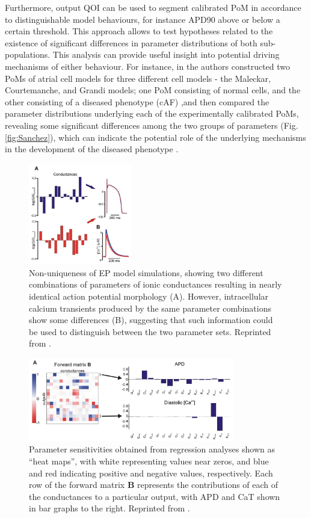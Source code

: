 \documentclass[12pt]{article}
\begin{document}
{Furthermore, output QOI can be used to segment calibrated PoM in accordance to distinguishable model behaviours, for instance APD90 above or below a certain threshold. This approach allows to test hypotheses related to the existence of significant differences in parameter distributions of both sub-populations. This analysis can provide useful insight into potential driving mechanisms of either behaviour. For instance, in \cite{Sanchez} the authors constructed two PoMs of atrial cell models for three different cell models - the Maleckar, Courtemanche, and Grandi models; one PoM consisting of normal cells, and the other consisting of a diseased phenotype (cAF) ,and then compared the parameter distributions underlying each of the experimentally calibrated PoMs, revealing some significant differences among the two groups of parameters (Fig. \ref{fig:Sanchez}), which can indicate the potential role of the underlying mechanisms in the development of the diseased phenotype .  

\begin{figure}[h]
	\centering
	\includegraphics[width=0.4\textwidth]{images/AP_CaT.png}
	\caption{Non-uniqueness of EP model simulations, showing two different combinations of parameters of ionic conductances resulting in nearly identical action potential morphology (A).  However, intracellular calcium  transients produced by the same parameter combinations show some differences (B), suggesting that such information could be used to distinguish between the two parameter sets. Reprinted from \cite{Sobie2010}.}
	\label{fig:AP_CaT}
\end{figure}

\begin{figure}[h]
	\centering
	\includegraphics[width=0.8\textwidth]{images/Sobie.png}
	\caption{Parameter sensitivities obtained from regression analyses shown as ``heat maps'',  with white representing values near zeros, and blue and red indicating positive and negative values, respectively. Each row of the forward matrix \textbf{B} represents the contributions of each of the conductances to a particular output, with APD and CaT shown in bar graphs to the right. Reprinted from \cite{Sobie2010}.}
	\label{fig:Sobie}
\end{figure}

}
\end{document}
